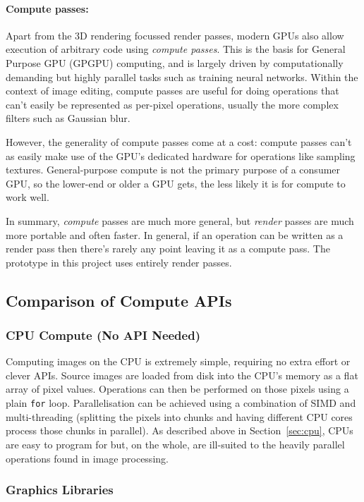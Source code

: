 \documentclass[12pt]{article}
\begin{document}
\paragraph{Compute passes:} Apart from the 3D rendering focussed render passes, modern GPUs also
allow execution of arbitrary code using \emph{compute passes}.  This is the basis for General
Purpose GPU (GPGPU) computing, and is largely driven by computationally demanding but highly
parallel tasks such as training neural networks.  Within the context of image editing, compute
passes are useful for doing operations that can't easily be represented as per-pixel operations,
usually the more complex filters such as Gaussian blur.

However, the generality of compute passes come at a cost: compute passes can't as easily make use of
the GPU's dedicated hardware for operations like sampling textures.  General-purpose compute is not
the primary purpose of a consumer GPU, so the lower-end or older a GPU gets, the less likely it is
for compute to work well.

In summary, \emph{compute} passes are much more general, but \emph{render} passes are much more
portable and often faster.  In general, if an operation can be written as a render pass then there's
rarely any point leaving it as a compute pass.  The prototype in this project uses entirely render
passes.

\subsection{Comparison of Compute APIs}

\subsubsection{CPU Compute (No API Needed)}

Computing images on the CPU is extremely simple, requiring no extra effort or clever APIs.  Source
images are loaded from disk into the CPU's memory as a flat array of pixel values.  Operations can
then be performed on those pixels using a plain \verb|for| loop.  Parallelisation can be achieved
using a combination of SIMD and multi-threading (splitting the pixels into chunks and having
different CPU cores process those chunks in parallel).  As described above in Section~\ref{sec:cpu},
CPUs are easy to program for but, on the whole, are ill-suited to the heavily parallel operations
found in image processing.

\subsubsection{Graphics Libraries}
\end{document}
